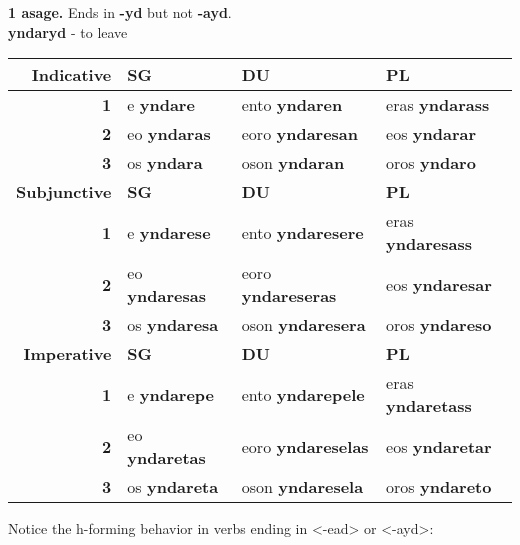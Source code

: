 \documentclass{book}
\begin{document}
\begin{center}
  \textbf{1 asage.} Ends in \textbf{-yd} but not \textbf{-ayd}. \\
  \textbf{yndaryd} - to leave \\
  \begin{tabular}{|r|l|l|l|}
    \hline
    \textbf{Indicative} & \textbf{SG} & \textbf{DU} & \textbf{PL} \\ \hline
    \textbf{1} & e \textbf{yndare} & ento \textbf{yndaren} & eras \textbf{yndarass} \\ \hline
    \textbf{2} & eo \textbf{yndaras} & eoro \textbf{yndaresan} & eos \textbf{yndarar} \\ \hline
    \textbf{3} & os \textbf{yndara} & oson \textbf{yndaran} & oros \textbf{yndaro} \\ \hline
    \textbf{Subjunctive} & \textbf{SG} & \textbf{DU} & \textbf{PL} \\ \hline
    \textbf{1} & e \textbf{yndarese} & ento \textbf{yndaresere} & eras \textbf{yndaresass} \\ \hline
    \textbf{2} & eo \textbf{yndaresas} & eoro \textbf{yndareseras} & eos \textbf{yndaresar} \\ \hline
    \textbf{3} & os \textbf{yndaresa} & oson \textbf{yndaresera} & oros \textbf{yndareso} \\ \hline
    \textbf{Imperative} & \textbf{SG} & \textbf{DU} & \textbf{PL} \\ \hline
    \textbf{1} & e \textbf{yndarepe} & ento \textbf{yndarepele} & eras \textbf{yndaretass} \\ \hline
    \textbf{2} & eo \textbf{yndaretas} & eoro \textbf{yndareselas} & eos \textbf{yndaretar} \\ \hline
    \textbf{3} & os \textbf{yndareta} & oson \textbf{yndaresela} & oros \textbf{yndareto} \\ \hline
  \end{tabular}
\end{center}

  \pagebreak

  Notice the h-forming behavior in verbs ending in <-ead> or <-ayd>:
\end{document}
